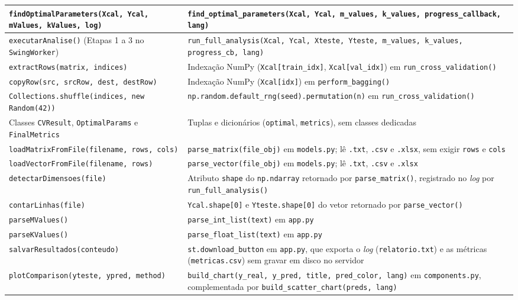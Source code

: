 \begin{longtable}{|>{\raggedright\arraybackslash}p{}|>{\raggedright\arraybackslash}p{}|}
\texttt{findOptimalParameters(Xcal, Ycal, mValues, kValues, log)} & \texttt{find\_optimal\_parameters(Xcal, Ycal, m\_values, k\_values, progress\_callback, lang)} \\ \hline
\texttt{executarAnalise()} (Etapas 1 a 3 no \texttt{SwingWorker}) & \texttt{run\_full\_analysis(Xcal, Ycal, Xteste, Yteste, m\_values, k\_values, progress\_cb, lang)} \\ \hline
\texttt{extractRows(matrix, indices)} & Indexação NumPy (\texttt{Xcal[train\_idx]}, \texttt{Xcal[val\_idx]}) em \texttt{run\_cross\_validation()} \\ \hline
\texttt{copyRow(src, srcRow, dest, destRow)} & Indexação NumPy (\texttt{Xcal[idx]}) em \texttt{perform\_bagging()} \\ \hline
\texttt{Collections.shuffle(indices, new Random(42))} & \texttt{np.random.default\_rng(seed).permutation(n)} em \texttt{run\_cross\_validation()} \\ \hline
Classes \texttt{CVResult}, \texttt{OptimalParams} e \texttt{FinalMetrics} & Tuplas e dicionários (\texttt{optimal}, \texttt{metrics}), sem classes dedicadas \\ \hline

\texttt{loadMatrixFromFile(filename, rows, cols)} & \texttt{parse\_matrix(file\_obj)} em \texttt{models.py}; lê \texttt{.txt}, \texttt{.csv} e \texttt{.xlsx}, sem exigir \texttt{rows} e \texttt{cols} \\ \hline
\texttt{loadVectorFromFile(filename, rows)} & \texttt{parse\_vector(file\_obj)} em \texttt{models.py}; lê \texttt{.txt}, \texttt{.csv} e \texttt{.xlsx} \\ \hline
\texttt{detectarDimensoes(file)} & Atributo \texttt{shape} do \texttt{np.ndarray} retornado por \texttt{parse\_matrix()}, registrado no \textit{log} por \texttt{run\_full\_analysis()} \\ \hline
\texttt{contarLinhas(file)} & \texttt{Ycal.shape[0]} e \texttt{Yteste.shape[0]} do vetor retornado por \texttt{parse\_vector()} \\ \hline
\texttt{parseMValues()} & \texttt{parse\_int\_list(text)} em \texttt{app.py} \\ \hline
\texttt{parseKValues()} & \texttt{parse\_float\_list(text)} em \texttt{app.py} \\ \hline

\texttt{salvarResultados(conteudo)} & \texttt{st.download\_button} em \texttt{app.py}, que exporta o \textit{log} (\texttt{relatorio.txt}) e as métricas (\texttt{metricas.csv}) sem gravar em disco no servidor \\ \hline
\texttt{plotComparison(yteste, ypred, method)} & \texttt{build\_chart(y\_real, y\_pred, title, pred\_color, lang)} em \texttt{components.py}, complementada por \texttt{build\_scatter\_chart(preds, lang)} \\ \hline


\end{longtable}
